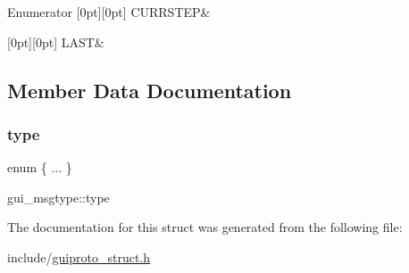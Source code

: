 \begin{DoxyEnumFields}{Enumerator}
[0pt][0pt]{}\mbox{\label{structgui__msgtype_a656b49196bb7a97a45652e57834ddf98a60a3471213f446faa50c95bfd3de7c04}} 
C\+U\+R\+R\+S\+T\+EP&\\
\hline

[0pt][0pt]{}\mbox{\label{structgui__msgtype_a656b49196bb7a97a45652e57834ddf98ae77956dbc7d53c2c94a6d4c56d5f8fe4}} 
L\+A\+ST&\\
\hline

\end{DoxyEnumFields}


\subsection{Member Data Documentation}
\mbox{\label{structgui__msgtype_aa87bf17e4e06ec3af18397f32216b154}} 
\subsubsection{\texorpdfstring{type}{type}}
{\footnotesize\ttfamily enum \{ ... \} 

          gui\+\_\+msgtype\+::type}



The documentation for this struct was generated from the following file\+:\begin{DoxyCompactItemize}
\item 
include/\mbox{\hyperlink{guiproto__struct_8h}{guiproto\+\_\+struct.\+h}}\end{DoxyCompactItemize}
